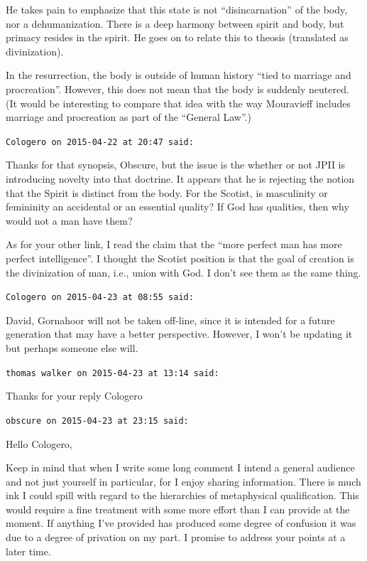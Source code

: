 \begin{footnotesize}
\begin{sffamily}
He takes pain to emphasize that this state is not ``disincarnation'' of the body, nor a dehumanization. There is a deep harmony between spirit and body, but primacy resides in the spirit. He goes on to relate this to theosis (translated as divinization).

In the resurrection, the body is outside of human history ``tied to marriage and procreation''. However, this does not mean that the body is suddenly neutered. (It would be interesting to compare that idea with the way Mouravieff includes marriage and procreation as part of the ``General Law''.)

\hfill

\texttt{Cologero on 2015-04-22 at 20:47 said:}

Thanks for that synopsis, Obscure, but the issue is the whether or not JPII is introducing novelty into that doctrine. It appears that he is rejecting the notion that the Spirit is distinct from the body. For the Scotist, is masculinity or femininity an accidental or an essential quality? If God has qualities, then why would not a man have them?

As for your other link, I read the claim that the ``more perfect man has more perfect intelligence''. I thought the Scotist position is that the goal of creation is the divinization of man, i.e., union with God. I don't see them as the same thing.

\hfill

\texttt{Cologero on 2015-04-23 at 08:55 said:}

David, Gornahoor will not be taken off-line, since it is intended for a future generation that may have a better perspective. However, I won't be updating it but perhaps someone else will.

\hfill

\texttt{thomas walker on 2015-04-23 at 13:14 said:}

Thanks for your reply Cologero

\hfill

\texttt{obscure on 2015-04-23 at 23:15 said:}

Hello Cologero,

Keep in mind that when I write some long comment I intend a general audience and not just yourself in particular, for I enjoy sharing information. There is much ink I could spill with regard to the hierarchies of metaphysical qualification. This would require a fine treatment with some more effort than I can provide at the moment. If anything I've provided has produced some degree of confusion it was due to a degree of privation on my part. I promise to address your points at a later time.


\end{sffamily}
\end{footnotesize}
